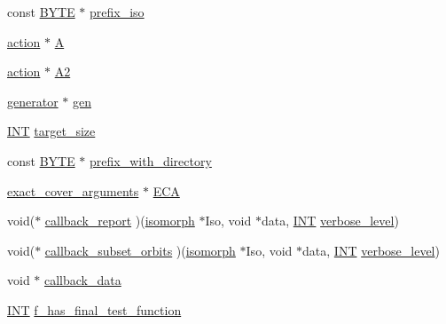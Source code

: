 \begin{DoxyCompactItemize}
\item 
const \mbox{\hyperlink{galois_8h_ab6cc7b4aeb6ea31aba2b3fbfc83ff5e6}{B\+Y\+TE}} $\ast$ \mbox{\hyperlink{classisomorph__arguments_ad49f18bb9504f56452288eadecdb0564}{prefix\+\_\+iso}}
\item 
\mbox{\hyperlink{classaction}{action}} $\ast$ \mbox{\hyperlink{classisomorph__arguments_a2f22802a348359402152357de07c9241}{A}}
\item 
\mbox{\hyperlink{classaction}{action}} $\ast$ \mbox{\hyperlink{classisomorph__arguments_a161efd39c0beab1782a0872c4ee046ac}{A2}}
\item 
\mbox{\hyperlink{classgenerator}{generator}} $\ast$ \mbox{\hyperlink{classisomorph__arguments_a3d279de859c51e6c2868b2f624f93e8b}{gen}}
\item 
\mbox{\hyperlink{galois_8h_a09fddde158a3a20bd2dcadb609de11dc}{I\+NT}} \mbox{\hyperlink{classisomorph__arguments_a3a5cd2be7246c5c8e329e432621a557b}{target\+\_\+size}}
\item 
const \mbox{\hyperlink{galois_8h_ab6cc7b4aeb6ea31aba2b3fbfc83ff5e6}{B\+Y\+TE}} $\ast$ \mbox{\hyperlink{classisomorph__arguments_ac21f8609cf5620ccdbe32338e7710b7f}{prefix\+\_\+with\+\_\+directory}}
\item 
\mbox{\hyperlink{classexact__cover__arguments}{exact\+\_\+cover\+\_\+arguments}} $\ast$ \mbox{\hyperlink{classisomorph__arguments_ac8cac0da7469d046e325b2612b3f98bb}{E\+CA}}
\item 
void($\ast$ \mbox{\hyperlink{classisomorph__arguments_aec21d9b73f1bd4182fc1f398f35c6921}{callback\+\_\+report}} )(\mbox{\hyperlink{classisomorph}{isomorph}} $\ast$Iso, void $\ast$data, \mbox{\hyperlink{galois_8h_a09fddde158a3a20bd2dcadb609de11dc}{I\+NT}} \mbox{\hyperlink{simeon_8_c_a818073fbcc2f439e7c56952f67386122}{verbose\+\_\+level}})
\item 
void($\ast$ \mbox{\hyperlink{classisomorph__arguments_ac41f99402493e576e9f79391609fd5e4}{callback\+\_\+subset\+\_\+orbits}} )(\mbox{\hyperlink{classisomorph}{isomorph}} $\ast$Iso, void $\ast$data, \mbox{\hyperlink{galois_8h_a09fddde158a3a20bd2dcadb609de11dc}{I\+NT}} \mbox{\hyperlink{simeon_8_c_a818073fbcc2f439e7c56952f67386122}{verbose\+\_\+level}})
\item 
void $\ast$ \mbox{\hyperlink{classisomorph__arguments_ac53dfbe0734ea0e17d04d5ff6d06981c}{callback\+\_\+data}}
\item 
\mbox{\hyperlink{galois_8h_a09fddde158a3a20bd2dcadb609de11dc}{I\+NT}} \mbox{\hyperlink{classisomorph__arguments_a4961202837fb99fee929c750a590f318}{f\+\_\+has\+\_\+final\+\_\+test\+\_\+function}}

\end{DoxyCompactItemize}
